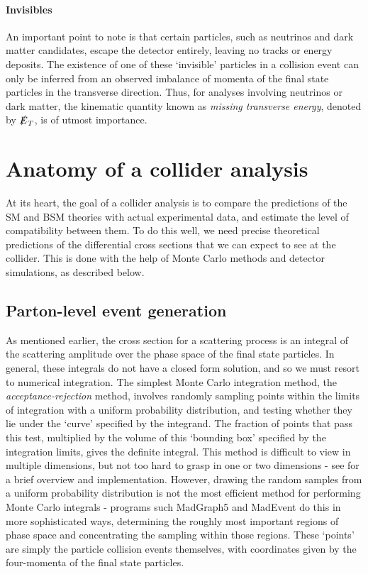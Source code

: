 \paragraph{Invisibles} An important point to note is that certain particles, such as neutrinos and dark matter candidates, escape the detector entirely, leaving no tracks or energy deposits. The existence of one of these `invisible' particles in a collision event can only be inferred from an observed imbalance of momenta of the final state particles in the transverse direction. Thus, for analyses involving neutrinos or dark matter, the kinematic quantity known as \emph{missing transverse energy}, denoted by $\slashed{E}_T$, is of utmost importance.

\section{Anatomy of a collider analysis}
At its heart, the goal of a collider analysis is to compare the predictions of the SM and BSM theories with actual experimental data, and estimate the level of compatibility between them. To do this well, we need precise theoretical predictions of the differential cross sections that we can expect to see at the collider. This is done with the help of Monte Carlo methods and detector simulations, as described below. 
\subsection{Parton-level event generation}
As mentioned earlier, the cross section for a scattering process is an integral of the scattering amplitude over the phase space of the final state particles. 
In general, these integrals do not have a closed form solution, and so we must resort to numerical integration. The simplest Monte Carlo integration method, the \emph{acceptance-rejection} method, involves randomly sampling points within the limits of integration with a uniform probability distribution, and testing whether they lie under the `curve' specified by the integrand. The fraction of points that pass this test, multiplied by the volume of this `bounding box' specified by the integration limits, gives the definite integral. This method is difficult to view in multiple dimensions, but not too hard to grasp in one or two dimensions - see \citep{Pyarelal2011} for a brief overview and implementation. However, drawing the random samples from a uniform probability distribution is not the most efficient method for performing Monte Carlo integrals - programs such MadGraph5 and MadEvent \citep{Alwall2014} do this in more sophisticated ways, determining the roughly most important regions of phase space and concentrating the sampling within those regions. These `points' are simply the particle collision events themselves, with coordinates given by the four-momenta of the final state particles. 

